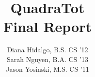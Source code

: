 \documentclass[11pt,letterpaper]{article}
\title{QuadraTot \\
{\normalsize \sc Final Report}}
\author{Diana Hidalgo, B.S. CS '12\\
Sarah Nguyen, B.A. CS '13\\
Jason Yosinski, M.S. CS '11 \\
\code{\{djh283,smn64,jy495\}@cornell.edu}}
\begin{document}
\maketitle
\normalem

\begin{abstract}

\end{abstract}







\end{document}

